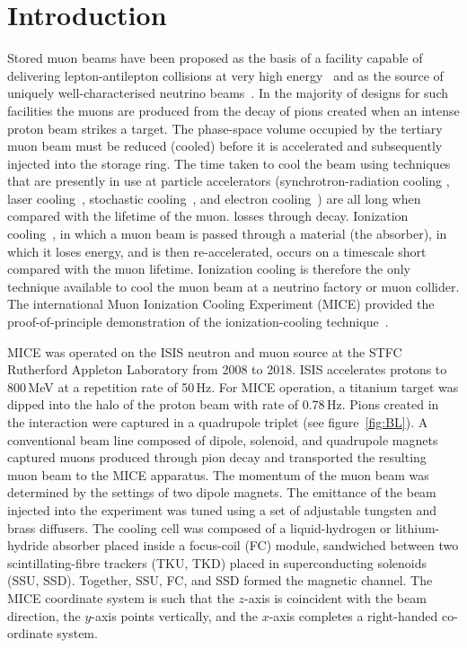 \section{Introduction}
\label{Sect:Intro}

Stored muon beams have been proposed as the basis of a facility
capable of delivering lepton-antilepton collisions at very high
energy~\cite{Neuffer:1994bt,Palmer:2014nza} and as the source of
uniquely well-characterised neutrino 
beams~\cite{Geer:1998PhRvD..57.6989G,Bandyopadhyay:2007kx,Apollonio:2002en}.
In the majority of designs for such facilities the muons are produced
from the decay of pions created when an intense proton beam strikes a
target.
The phase-space volume occupied by the tertiary muon beam must be
reduced (cooled) before it is accelerated and subsequently injected
into the storage ring.
The time taken to cool the beam using techniques that are presently in
use at particle accelerators (synchrotron-radiation cooling
\cite{2012acph.book.....L}, laser
cooling~\cite{PhysRevLett.64.2901,PhysRevLett.67.1238,doi:10.1063/1.329218},
stochastic cooling~\cite{Marriner:2003mn}, and electron
cooling~\cite{1063-7869-43-5-R01}) are all long when compared with the
lifetime of the muon.
losses through decay.
Ionization cooling~\cite{cooling_methods,Neuffer:1983jr}, in which a
muon beam is passed through a material (the absorber), in which it
loses energy, and is then re-accelerated, occurs on a timescale short
compared with the muon lifetime.
Ionization cooling is therefore the only technique available to cool the muon beam at a neutrino factory or muon collider.
The international Muon Ionization Cooling Experiment (MICE)
provided the proof-of-principle demonstration of the
ionization-cooling technique~\cite{Bogomilov:2019kfj}.

MICE was operated on the ISIS neutron and muon source at the STFC
Rutherford Appleton Laboratory from 2008 to 2018.  
ISIS accelerates protons to 800\,MeV at a repetition rate of
50\,Hz.
For MICE operation, a titanium target was dipped
into the halo of the proton beam with rate of 0.78\,Hz. 
Pions created in the interaction were captured in a quadrupole triplet
(see figure~\ref{fig:BL}).
A conventional beam line composed of dipole, solenoid, and quadrupole
magnets captured muons produced through pion decay and transported the
resulting muon beam to the MICE apparatus.
The momentum of the muon beam was determined by the settings of two
dipole magnets.
The emittance of the beam injected into the experiment was tuned using
a set of adjustable tungsten and brass diffusers.
The cooling cell was composed of a liquid-hydrogen or lithium-hydride
absorber placed inside a focus-coil (FC) module, sandwiched between
two scintillating-fibre trackers (TKU, TKD) placed in superconducting
solenoids (SSU, SSD).
Together, SSU, FC, and SSD formed the magnetic channel.
The MICE coordinate system is such that the $z$-axis is coincident
with the beam direction, the $y$-axis points vertically, and the
$x$-axis completes a right-handed co-ordinate system.

